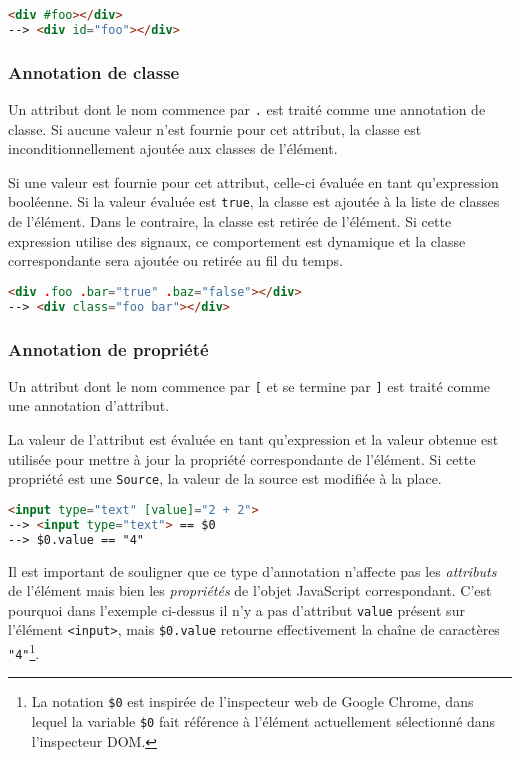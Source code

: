 \begin{lstlisting}[language=HTML]
<div #foo></div>
--> <div id="foo"></div>
\end{lstlisting}

\subsubsection{Annotation de classe}
Un attribut dont le nom commence par \texttt{.} est traité comme une annotation de classe. Si aucune valeur n'est fournie pour cet attribut, la classe est inconditionnellement ajoutée aux classes de l'élément.

Si une valeur est fournie pour cet attribut, celle-ci évaluée en tant qu'expression booléenne. Si la valeur évaluée est \texttt{true}, la classe est ajoutée à la liste de classes de l'élément. Dans le contraire, la classe est retirée de l'élément. Si cette expression utilise des signaux, ce comportement est dynamique et la classe correspondante sera ajoutée ou retirée au fil du temps.

\begin{lstlisting}[language=HTML]
<div .foo .bar="true" .baz="false"></div>
--> <div class="foo bar"></div>
\end{lstlisting}

\subsubsection{Annotation de propriété}
Un attribut dont le nom commence par \texttt{[} et se termine par \texttt{]} est traité comme une annotation d'attribut.

La valeur de l'attribut est évaluée en tant qu'expression et la valeur obtenue est utilisée pour mettre à jour la propriété correspondante de l'élément. Si cette propriété est une \texttt{Source}, la valeur de la source est modifiée à la place.

\begin{lstlisting}[language=HTML]
<input type="text" [value]="2 + 2">
--> <input type="text"> == $0
--> $0.value == "4"
\end{lstlisting}

Il est important de souligner que ce type d'annotation n'affecte pas les \emph{attributs} de l'élément mais bien les \emph{propriétés} de l'objet JavaScript correspondant. C'est pourquoi dans l'exemple ci-dessus il n'y a pas d'attribut \texttt{value} présent sur l'élément \texttt{<input>}, mais \texttt{\$0.value} retourne effectivement la chaîne de caractères \texttt{"4"}\footnote{La notation \texttt{\$0} est inspirée de l'inspecteur web de Google Chrome, dans lequel la variable \texttt{\$0} fait référence à l'élément actuellement sélectionné dans l'inspecteur DOM.}.

